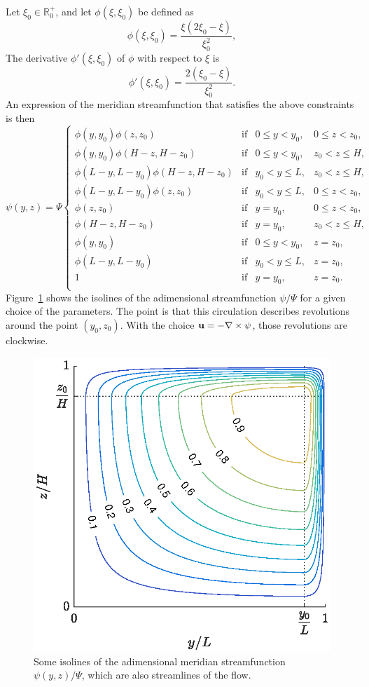 Let $\xi_0 \in \mathbb{R}_0^+$, and let $\phi(\xi,\xi_0)$ be defined as
\begin{equation} \label{eq:phi}
	\phi(\xi,\xi_0) = \frac{\xi(2\xi_0-\xi)}{\xi_0^2},
\end{equation}
The derivative $\phi'(\xi,\xi_0)$ of $\phi$ with respect to $\xi$ is
\begin{equation}
	\phi'(\xi,\xi_0) = \frac{2(\xi_0-\xi)}{\xi_0^2}.
\end{equation}
An expression of the meridian streamfunction that satisfies the above constraints is then
\begin{equation} \label{eq:psi_overturner}
	\psi(y,z) = \Psi\left\{ 
		\begin{array}{lrrr}
			\phi(y,y_0)\phi(z,z_0) & \mbox{if} & 0 \le y < y_0, & 0 \le z < z_0,\\
			\phi(y,y_0)\phi(H-z,H-z_0) & \mbox{if} & 0 \le y < y_0, & z_0 < z \le H,\\
			\phi(L-y,L-y_0)\phi(H-z,H-z_0) & \mbox{if} & y_0 < y \le L, &z_0 < z \le H,\\
			\phi(L-y,L-y_0)\phi(z,z_0) & \mbox{if} & y_0 < y \le L, & 0 \le z < z_0,\\
			\phi(z,z_0) & \mbox{if} & y = y_0, & 0 \le z < z_0,\\
			\phi(H-z,H-z_0) & \mbox{if} & y = y_0, & z_0 < z \le H,\\
			\phi(y,y_0) & \mbox{if} & 0 \le y < y_0, & z = z_0,\\
			\phi(L-y,L-y_0) & \mbox{if} & y_0 < y \le L, & z=z_0,\\
			1 & \mbox{if} & y = y_0, & z=z_0.\\
		\end{array}
	\right.
\end{equation}
Figure~\ref{fig:psi_overturner} shows the isolines of the adimensional streamfunction $\psi/\Psi$ for a given choice of the parameters. The point is that this circulation describes revolutions around the point $(y_0,z_0)$. With the choice $\mathbf u = - \nabla \times \psi$, those revolutions are clockwise.
\begin{figure}[!htp]
	\centering
	\includegraphics[width=.5\textwidth]{fig/overturner/psi.eps}
	\caption{Some isolines of the adimensional meridian streamfunction $\psi(y,z)/\Psi$, which are also streamlines of the flow.}
	\label{fig:psi_overturner}
\end{figure}

